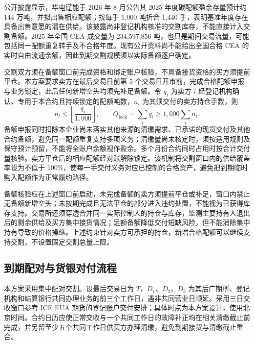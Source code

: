 \documentclass[UTF8,a4paper,11pt,oneside,fontset=fandol]{ctexart}
\begin{document}
公开披露显示，华电辽能于 2026 年 8 月公告其 2025 年度碳配额盈余存量预计约 144 万吨，并拟出售相应配额\cite{huadian2026surplus}；按每手 1,000 吨折合 1,440 手，表明基准年度存在具备出售意愿的潜在供给。该披露尚非登记机构核准的交割库存，不能直接计入交割备额。2025 年全国 CEA 成交量为 234,597,856 吨\cite{she2025annual}，也只是期间交易流量，可能包括同一配额重复转手及不合格年度。现有公开资料尚不能给出全国合格 CEA 的实时自由流通余额，因此到期交割规模须以实际备额逐户确定。

交割双方须在备额窗口前完成资格和绑定账户核验，不具备接货资格的买方须提前平仓。本方案要求卖方在最后交易日前第 5 个交易日开市前，完成合格配额申报与业务锁定，此后任何新增空头均须先补足备额。令 $q_i$ 为卖方 $i$ 经登记机构确认、专用于本合约且持续锁定的配额吨数，$n_i$ 为其须交付的卖方持仓手数，则
\[
 n_i\leq\left\lfloor\frac{q_i}{1{,}000}\right\rfloor,
 \qquad Q_{\mathrm{lock}}=\sum_i q_i\geq1{,}000\sum_i n_i.
\]
备额申报同时扣除本企业尚未落实其他来源的清缴需求、已承诺的现货交付及其他合约备额，避免同一配额重复支持多项义务；清缴量尚未核定时，须按适用规则及保守预计预留，不能将全账户余额视作盈余。多个月份合约同时占用时按合计交付量核验。卖方平仓后的相应配额经对账解除锁定。该机制将交割窗口内的供给覆盖率设为不低于 100\%，使每一手交付义务对应已控制的合格资产，避免把到期临时购入配额作为正常履约路径。

备额核验应在上述窗口前启动，未完成备额的卖方须提前平仓或补足，窗口内禁止无备额新增空头；未按期完成且无法平仓的部分进入违约处置，不能视为已获得库存支持。交易所还须穿透合并同一实际控制人的持仓与库存，监测主要持有人退出后的剩余供给及买方集中接货情况；足额备额降低交付短缺风险，但不能消除集中持有导致的价格操纵。上述约束针对卖方可承担的持仓，新增合格配额可以继续支持交割，不设置固定交割总量上限\cite{futuresLaw2022}。

\subsection{到期配对与货银对付流程}
本方案采用集中配对交割。设最后交易日为 $T$，$D_1$、$D_2$、$D_3$ 为其后广期所、登记机构和结算银行共同办理业务的前三个工作日，遇非共同营业日顺延。采用三日交收窗口参考 ICE EUA 期货的登记账户交付安排\cite{iceEuaSpecs}；具体时点为本方案设计，使用北京时间。合约日历应使正常交收与一个共同工作日的故障补正均在相关清缴截止前完成，并另留至少五个共同工作日供买方办理清缴，避免到期接货与清缴截止重合。
\end{document}
